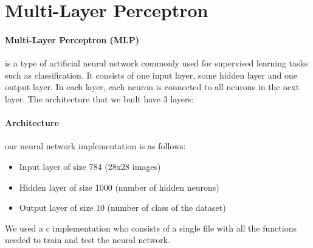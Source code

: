 \documentclass[11pt]{article}
\begin{document}

\maketitle %

\thispagestyle{empty} %

\newpage


\section{Multi-Layer Perceptron}

\paragraph*{Multi-Layer Perceptron (MLP)}is a type of artificial neural network commonly used for supervised learning tasks such as classification.
It consists of one input layer, some hidden layer and one output layer. In each layer, each neuron is connected to all neurons in the next layer.
The architecture that we built have 3 layers:

\paragraph*{Architecture} our neural network implementation is as follows:

\begin{itemize}
	\item Input layer of size 784 (28x28 images)
	\item Hidden layer of size 1000 (number of hidden neurons)
	\item Output layer of size 10 (number of class of the dataset)
\end{itemize}

We used a c implementation who consists of a single file with all the functions needed to train and test the neural network.
\end{document}
